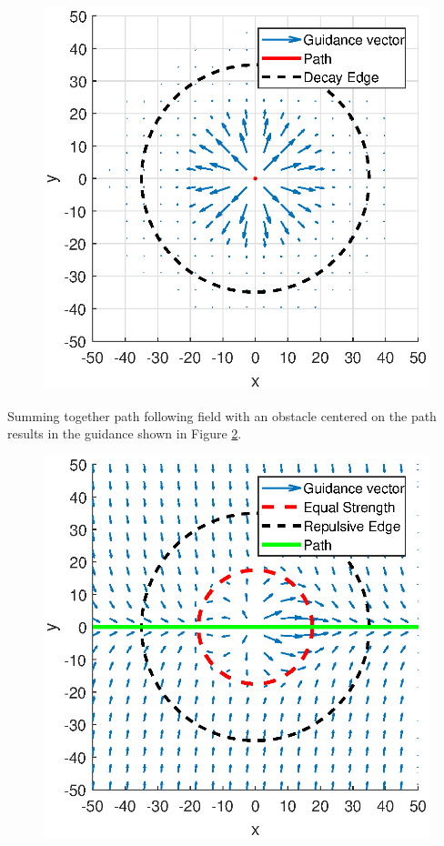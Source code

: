 \documentclass[conf]{new-aiaa}
\begin{document}
\begin{figure}[H]
	\centering
	\includegraphics[width=0.7\linewidth]{Figures/methods/decayApplied}
	\caption{}
	\label{fig:decayapplied}
\end{figure}


Summing together path following field with an obstacle centered on the path results in the guidance shown in Figure \ref{fig:summedquiver}.



\begin{figure}[H]
	\centering
	\includegraphics[width=0.7\linewidth]{Figures/methods/summedQuiver}
	\caption{}
	\label{fig:summedquiver}
\end{figure}
\end{document}
